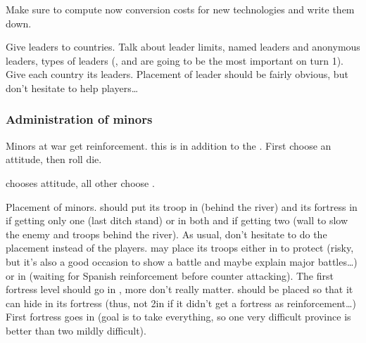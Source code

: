 \aparag Make sure to compute now conversion costs for new technologies and
write them down.

\aparag Give leaders to countries.
\bparag Talk about leader limits, named leaders and anonymous leaders, types
of leaders (\LeaderG, \LeaderE and \LeaderC are going to be the most important
on turn 1).
\bparag Give each country its leaders.
\bparag Placement of leader should be fairly obvious, but don't hesitate to
help players\ldots

\subsubsection{Administration of minors}
\aparag Minors at war get reinforcement.
\bparag this is in addition to the .
\bparag First choose an attitude, then roll die.

\aparag \paysSavoie chooses  attitude, all other choose
.

\aparag Placement of minors.
\bparag \paysCosaquesdon should put its troop in \provinceDon (behind the
river) and its fortress in \provinceDon if getting only one (last ditch stand)
or in both  and \provinceDonets if getting two (wall to
slow the enemy and troops behind the river). As usual, don't hesitate to do
the placement instead of the players.
\bparag \paysNaples may place its troops either in \provinceCampania to
protect \villeNaples (risky, but it's also a good occasion to show a battle
and maybe explain major battles\ldots) or in \provinceBasilicata (waiting for
Spanish reinforcement before counter attacking). The first fortress level
should go in \villeNaples, more don't really matter.
\bparag \paysGeorgie should be placed so that it can hide in its fortress
(thus, not 2\LD in \provinceGeorgie if it didn't get a fortress as
reinforcement\ldots) First fortress goes in \provinceGeorgie (\TUR goal is to
take everything, so one very difficult province is better than two mildly
difficult).


